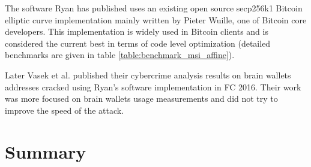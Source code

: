The software Ryan has published uses an existing open source secp256k1 Bitcoin elliptic curve implementation mainly written by Pieter Wuille, one of Bitcoin core developers. This implementation is widely used in Bitcoin clients and is considered the current best in terms of code level optimization (detailed benchmarks are given in  table \ref{table:benchmark_msi_affine}).

Later Vasek et al. published their cybercrime analysis results on brain wallets addresses cracked using Ryan's software implementation in FC 2016. Their work was more focused on brain wallets usage measurements and did not try to improve the speed of the attack.

\section{Summary}

